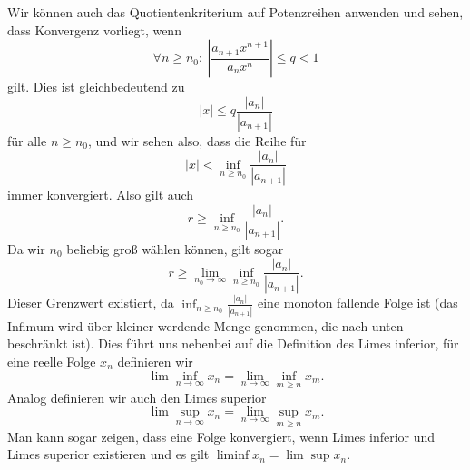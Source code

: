 \documentclass[letterpaper,10pt,english]{jupyterBook}
\begin{document}
Wir können auch das Quotientenkriterium auf Potenzreihen anwenden und sehen, dass Konvergenz vorliegt, wenn
\begin{equation*}
 \forall n \geq n_0: ~\left\vert \frac{a_{n+1} x^{n+1}}{a_n x^n} \right\vert \leq q < 1
\end{equation*}
gilt. Dies ist gleichbedeutend zu
\begin{equation*}
 |x| \leq q \frac{|a_n|}{|a_{n+1}|}
\end{equation*}
für alle \(n \geq n_0\), und wir sehen also, dass die Reihe für
\begin{equation*}
 |x|<\inf_{n \geq n_0} \frac{|a_n|}{|a_{n+1}|}
\end{equation*}
immer konvergiert. Also gilt auch
\begin{equation*}
 r \geq \inf_{n \geq n_0} \frac{|a_n|}{|a_{n+1}|} .
\end{equation*}
Da wir \(n_0\) beliebig groß wählen können, gilt sogar
\begin{equation*}
 r \geq \lim_{n_0 \rightarrow \infty} \inf_{n \geq n_0} \frac{|a_n|}{|a_{n+1}|} .
\end{equation*}
Dieser Grenzwert existiert, da \( \inf_{n \geq n_0} \frac{|a_n|}{|a_{n+1}|}\) eine monoton fallende Folge ist (das Infimum wird über kleiner werdende Menge genommen, die nach unten beschränkt ist).
Dies führt uns nebenbei  auf die Definition des Limes inferior, für eine reelle Folge \(x_n\) definieren wir
\begin{equation*}
 \lim\inf_{n \rightarrow \infty} x_n = \lim_{n \rightarrow \infty} \inf_{m \geq n} x_m .
\end{equation*}
Analog definieren wir auch den Limes superior
\begin{equation*}
 \lim\sup_{n \rightarrow \infty} x_n = \lim_{n \rightarrow \infty} \sup_{m \geq n} x_m .
\end{equation*}
Man kann sogar zeigen, dass eine Folge konvergiert, wenn Limes inferior und Limes superior existieren und es gilt \(\liminf x_n = \lim\sup x_n\).
\end{document}
